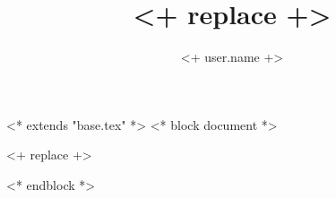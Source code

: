 <* extends "base.tex" *>
<* block document *>
\author{<+ user.name +>}
\title{<+ replace +>}


\maketitle

<+ replace +>

<* endblock *>
